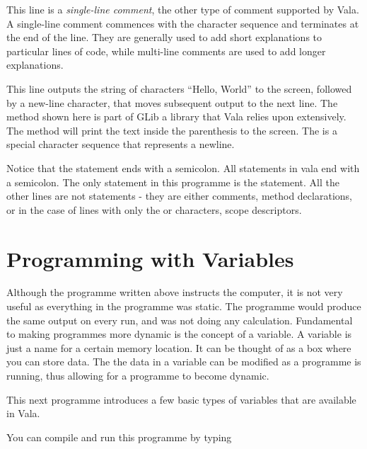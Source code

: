 
This line is a \emph{single-line comment}, the other type of comment supported by Vala. A single-line comment commences with the character sequence \inlinecode{//} and terminates at the end of the line. They are generally used to add short explanations to particular lines of code, while multi-line  comments are used to add longer explanations.


This line outputs the string of characters “Hello, World” to the screen, followed by a new-line character, that moves subsequent output to the next line. The  method shown here is part of GLib a library that Vala relies upon extensively. The  method will print the text inside the parenthesis to the screen. The  is a special character sequence that represents a newline.

Notice that the  statement ends with a semicolon. All statements in vala end with a semicolon. The only statement in this programme is the  statement. All the other lines are not statements - they are either comments, method declarations, or in the case of lines with only the \inlinecode{\{} or \inlinecode{\}} characters, scope descriptors.

\section{Programming with Variables}

Although the programme written above instructs the computer, it is not very useful as everything in the programme was static. The programme would produce the same output on every run, and was not doing any calculation. Fundamental to making programmes more dynamic is the concept of a variable. A variable is just a name for a certain memory location. It can be thought of as a box where you can store data. The the data in a variable can be modified as a programme is running, thus allowing for a programme to become dynamic.

This next programme introduces a few basic types of variables that are available in Vala.


You can compile and run this programme by typing

